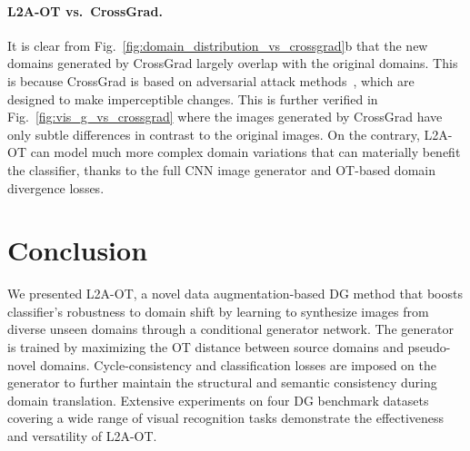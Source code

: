 \documentclass[runningheads]{llncs}
\begin{document}
\paragraph{L2A-OT vs.~CrossGrad.}
It is clear from Fig.~\ref{fig:domain_distribution_vs_crossgrad}b that the new domains generated by CrossGrad largely overlap with the original domains. This is because CrossGrad is based on adversarial attack methods~\cite{goodfellow2015explaining}, which are designed to make imperceptible changes. This is further verified in Fig.~\ref{fig:vis_g_vs_crossgrad} where the images generated by CrossGrad have only subtle differences in contrast to the original images. On the contrary, L2A-OT can model much more complex domain variations that can materially benefit the classifier, thanks to the full CNN image generator and OT-based domain divergence losses.

\section{Conclusion} \label{sec:conclusion}
We presented L2A-OT, a novel data augmentation-based DG method that boosts classifier's robustness to domain shift by learning to synthesize images from diverse unseen domains through a conditional generator network. The generator is trained by maximizing the OT distance between source domains and pseudo-novel domains. Cycle-consistency and classification losses are imposed on the generator to further maintain the structural and semantic consistency during domain translation. Extensive experiments on four DG benchmark datasets covering a wide range of visual recognition tasks demonstrate the effectiveness and versatility of L2A-OT.




\end{document}
